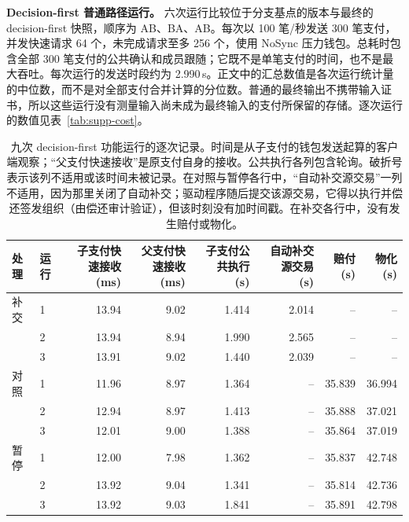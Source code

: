 \noindent\textbf{Decision-first 普通路径运行。}
六次运行比较位于分支基点的版本与最终的 decision-first 快照，顺序为 AB、BA、AB。每次以 100 笔/秒发送 300 笔支付，并发快速请求 64 个，未完成请求至多 256 个，使用 NoSync 压力钱包。总耗时包含全部 300 笔支付的公共确认和成员跟随；它既不是单笔支付的时间，也不是最大吞吐。每次运行的发送时段约为 2.990\,s。正文中的汇总数值是各次运行统计量的中位数，而不是对全部支付合并计算的分位数。普通的最终输出不携带输入证书，所以这些运行没有测量输入尚未成为最终输入的支付所保留的存储。逐次运行的数值见表~\ref{tab:supp-cost}。

\begin{table}[t]
  \caption{九次 decision-first 功能运行的逐次记录。时间是从子支付的钱包发送起算的客户端观察；“父支付快速接收”是原支付自身的接收。公共执行各列包含轮询。破折号表示该列不适用或该时间未被记录。在对照与暂停各行中，“自动补交源交易”一列不适用，因为那里关闭了自动补交；驱动程序随后提交该源交易，它得以执行并偿还签发组织（由偿还审计验证），但该时刻没有加时间戳。在补交各行中，没有发生赔付或物化。}
  \label{tab:supp-functional}
  \centering
  \small
  \setlength{\tabcolsep}{4pt}
  \begin{tabular}{@{}llrrrrrr@{}}
    \toprule
    处理 & 运行 & \shortstack{子支付快速接收\\(ms)} & \shortstack{父支付快速接收\\(ms)}
      & \shortstack{子支付公共执行\\(s)} & \shortstack{自动补交源交易\\(s)} & \shortstack{赔付\\(s)}
      & \shortstack{物化\\(s)} \\
    \midrule
    补交 & 1 & 13.94 & 9.02 & 1.414 & 2.014 & -- & -- \\
     & 2 & 13.94 & 8.94 & 1.990 & 2.565 & -- & -- \\
     & 3 & 13.91 & 9.02 & 1.440 & 2.039 & -- & -- \\
    \addlinespace
    对照 & 1 & 11.96 & 8.97 & 1.364 & -- & 35.839 & 36.994 \\
     & 2 & 12.94 & 8.97 & 1.413 & -- & 35.888 & 37.021 \\
     & 3 & 12.01 & 9.00 & 1.388 & -- & 35.864 & 37.019 \\
    \addlinespace
    暂停 & 1 & 12.00 & 7.98 & 1.362 & -- & 35.837 & 42.748 \\
     & 2 & 13.92 & 9.04 & 1.341 & -- & 35.814 & 42.736 \\
     & 3 & 13.92 & 9.03 & 1.841 & -- & 35.891 & 42.798 \\
    \bottomrule
  \end{tabular}
\end{table}


